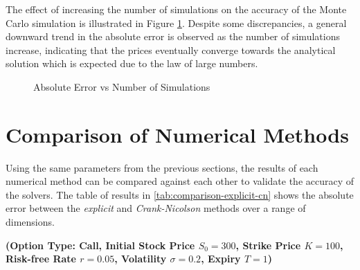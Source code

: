 The effect of increasing the number of simulations on the accuracy of the Monte Carlo simulation is illustrated in Figure \ref{fig:convergence}. Despite some discrepancies, a general downward trend in the absolute error is observed as the number of simulations increase, indicating that the prices eventually converge towards the analytical solution which is expected due to the law of large numbers.
\begin{figure}[H]
    \centering
    \caption{Absolute Error vs Number of Simulations}
    \label{fig:convergence}
\end{figure}

\section{Comparison of Numerical Methods}\label{sec:comparison_numerical_methods}
Using the same parameters from the previous sections, the results of each numerical method can be compared against each other to validate the accuracy of the solvers. The table of results in \ref{tab:comparison-explicit-cn} shows the absolute error between the \textit{explicit} and \textit{Crank-Nicolson} methods over a range of dimensions. 


\textbf{(Option Type: Call, Initial Stock Price $S_0 = 300$, Strike Price $K = 100$, Risk-free Rate $r = 0.05$, Volatility $\sigma = 0.2$, Expiry $T = 1$)}

